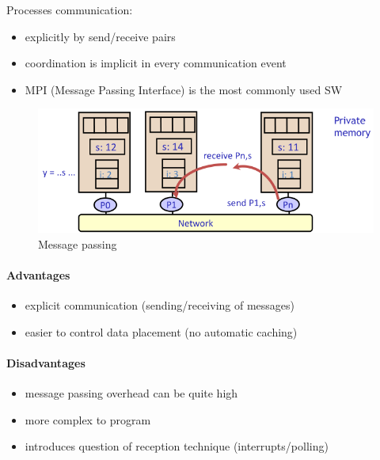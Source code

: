 Processes communication:
\begin{itemize}
    \item explicitly by send/receive pairs
    \item coordination is implicit in every communication event
    \item MPI (Message Passing Interface) is the most commonly used SW
\end{itemize}

\begin{figure}[h]
    \centering
    \includegraphics[width = \linewidth]{images/message-passing-model}
    \caption{Message passing}
    \label{fig:message-passing-model}
\end{figure}

\paragraph{Advantages}
\begin{itemize}
    \item explicit communication (sending/receiving of messages)
    \item easier to control data placement (no automatic caching)
\end{itemize}

\paragraph{Disadvantages}
\begin{itemize}
    \item message passing overhead can be quite high
    \item more complex to program
    \item introduces question of reception technique (interrupts/polling)
\end{itemize}

